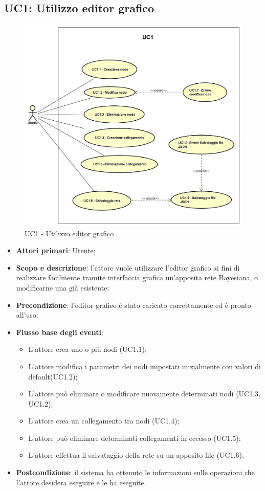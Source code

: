 \subsection{UC1: Utilizzo editor grafico}
\hypertarget{UC1}{} 
\begin{figure} [H]
	\centering
	\includegraphics[scale=0.45]{Img/UC1} 
	\caption{UC1 - Utilizzo editor grafico} \label{} 
\end{figure} 
\begin{itemize} 
	\item{\textbf{Attori primari}: Utente;}
	\item{\textbf{Scopo e descrizione}: l'attore vuole utilizzare l'editor grafico ai fini di realizzare facilmente tramite interfaccia grafica un'apposita rete Bayesiana, o modificarne una già esistente;} 
	\item{\textbf{Precondizione}: l'editor grafico è stato caricato correttamente ed è pronto all'uso;} 
	\item{\textbf{Flusso base degli eventi}: 
		\begin{itemize} 
			\item{L'attore crea uno o più nodi (UC1.1);} 
			\item{L'attore modifica i parametri dei nodi impostati inizialmente con valori di default(UC1.2);} 
			\item{L'attore può eliminare o modificare nuovamente determinati nodi (UC1.3, UC1.2)}; 
			\item{L'attore crea un collegamento tra nodi (UC1.4);} 
			\item{L'attore può eliminare determinati collegamenti in eccesso (UC1.5);} 
			\item{L'attore effettua il salvataggio della rete su un apposito file (UC1.6).} 
		\end{itemize} 
	} 
	\item{\textbf{Postcondizione}: il sistema ha ottenuto le informazioni sulle operazioni che l'attore desidera eseguire e le ha eseguite.} 
\end{itemize} 
